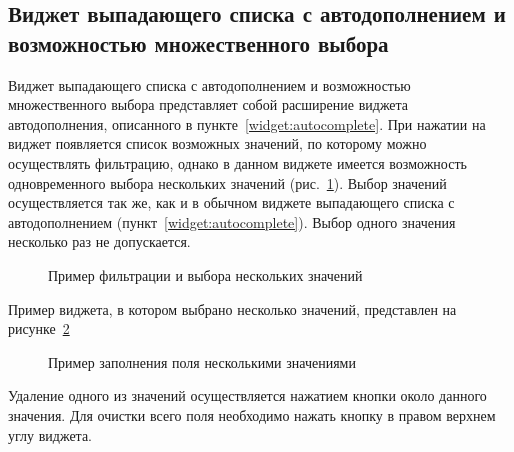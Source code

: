 \subsection{Виджет выпадающего списка с автодополнением и возможностью множественного выбора}
\label{widget:autocomplete_with_multiselect}
Виджет выпадающего списка с автодополнением и возможностью множественного выбора представляет собой расширение виджета автодополнения, описанного в пункте~\ref{widget:autocomplete}. При нажатии на виджет появляется список возможных значений, по которому можно осуществлять фильтрацию, однако в данном виджете имеется возможность одновременного выбора нескольких значений (рис.~\ref{img:widgect:mutliselect_filter_view}). Выбор значений осуществляется так же, как и в обычном виджете выпадающего списка с автодополнением (пункт~\ref{widget:autocomplete}). Выбор одного значения несколько раз не допускается.
\begin{figure}[H]
	\caption{Пример фильтрации и выбора нескольких значений}
	\label{img:widgect:mutliselect_filter_view}
\end{figure}
 Пример виджета, в котором выбрано несколько значений, представлен на рисунке~\ref{img:widgect:mutliselect_multi_view}
 \begin{figure}[H]
 	\caption{Пример заполнения поля несколькими значениями}
 	\label{img:widgect:mutliselect_multi_view}
 \end{figure}
 
 Удаление одного из значений осуществляется нажатием кнопки \quotes{$\times$} около данного значения. Для очистки всего поля необходимо нажать кнопку \quotes{$\times$} в правом верхнем углу виджета.
 
